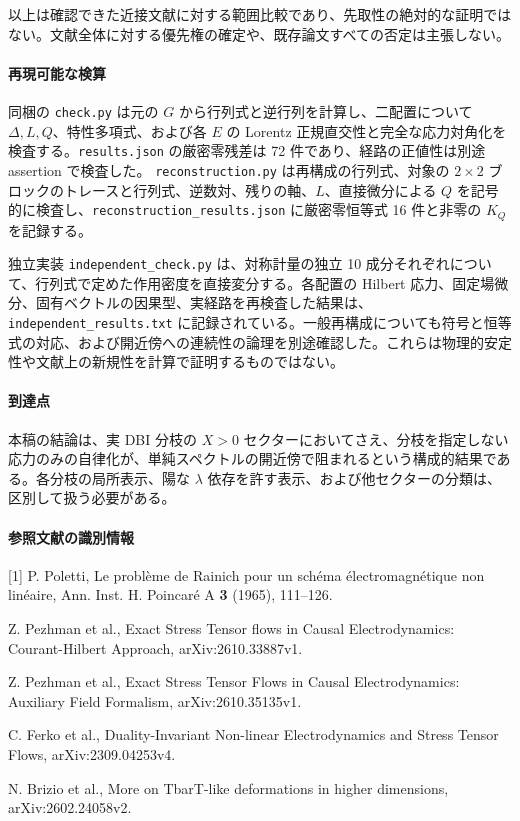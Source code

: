 \documentclass[11pt,a4paper]{article}
\begin{document}
以上は確認できた近接文献に対する範囲比較であり、先取性の絶対的な証明ではない。文献全体に対する優先権の確定や、既存論文すべての否定は主張しない。

\paragraph{再現可能な検算}
同梱の \texttt{check.py} は元の $G$ から行列式と逆行列を計算し、二配置について $\Delta,L,Q$、特性多項式、および各 $E$ の Lorentz 正規直交性と完全な応力対角化を検査する。\texttt{results.json} の厳密零残差は 72 件であり、経路の正値性は別途 assertion で検査した。
\texttt{reconstruction.py} は再構成の行列式、対象の $2\times2$ ブロックのトレースと行列式、逆数対、残りの軸、$L$、直接微分による $Q$ を記号的に検査し、\texttt{reconstruction\_results.json} に厳密零恒等式 16 件と非零の $K_Q$ を記録する。

独立実装 \texttt{independent\_check.py} は、対称計量の独立 10 成分それぞれについて、行列式で定めた作用密度を直接変分する。各配置の Hilbert 応力、固定場微分、固有ベクトルの因果型、実経路を再検査した結果は、\texttt{independent\_results.txt} に記録されている。一般再構成についても符号と恒等式の対応、および開近傍への連続性の論理を別途確認した。これらは物理的安定性や文献上の新規性を計算で証明するものではない。

\paragraph{到達点}
本稿の結論は、実 DBI 分枝の $X>0$ セクターにおいてさえ、分枝を指定しない応力のみの自律化が、単純スペクトルの開近傍で阻まれるという構成的結果である。各分枝の局所表示、陽な $\lambda$ 依存を許す表示、および他セクターの分類は、区別して扱う必要がある。

\paragraph{参照文献の識別情報}
\begingroup\small
[1] P. Poletti, \textup{Le problème de Rainich pour un schéma électromagnétique non linéaire}, Ann. Inst. H. Poincaré A \textbf{3} (1965), 111--126.\par\noindent
[2] Z. Pezhman et al., \textup{Exact Stress Tensor flows in Causal Electrodynamics: Courant-Hilbert Approach}, arXiv:2610.33887v1.\par\noindent
[3] Z. Pezhman et al., \textup{Exact Stress Tensor Flows in Causal Electrodynamics: Auxiliary Field Formalism}, arXiv:2610.35135v1.\par\noindent
[4] C. Ferko et al., \textup{Duality-Invariant Non-linear Electrodynamics and Stress Tensor Flows}, arXiv:2309.04253v4.\par\noindent
[5] N. Brizio et al., \textup{More on TbarT-like deformations in higher dimensions}, arXiv:2602.24058v2.
\endgroup
\end{document}
